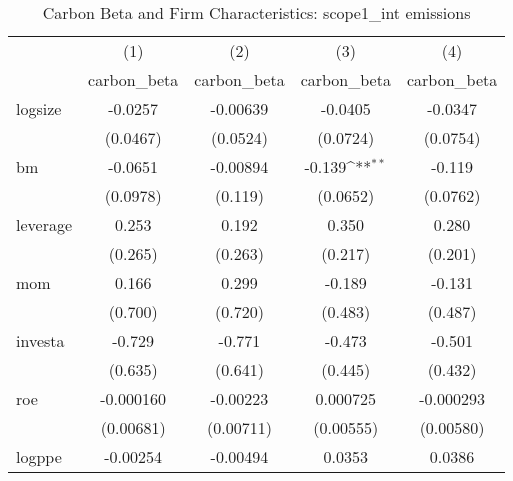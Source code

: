 \begin{table}[htbp]\centering
\def\sym#1{\ifmmode^{#1}\else\(^{#1}\)\fi}
\caption{Carbon Beta and Firm Characteristics: scope1\_int emissions}
\begin{tabular}{l*{4}{c}}
\hline\hline
                    &\multicolumn{1}{c}{(1)}&\multicolumn{1}{c}{(2)}&\multicolumn{1}{c}{(3)}&\multicolumn{1}{c}{(4)}\\
                    &\multicolumn{1}{c}{carbon\_beta}&\multicolumn{1}{c}{carbon\_beta}&\multicolumn{1}{c}{carbon\_beta}&\multicolumn{1}{c}{carbon\_beta}\\
\hline
logsize             &     -0.0257         &    -0.00639         &     -0.0405         &     -0.0347         \\
                    &    (0.0467)         &    (0.0524)         &    (0.0724)         &    (0.0754)         \\
[1em]
bm                  &     -0.0651         &    -0.00894         &      -0.139\sym{**} &      -0.119         \\
                    &    (0.0978)         &     (0.119)         &    (0.0652)         &    (0.0762)         \\
[1em]
leverage            &       0.253         &       0.192         &       0.350         &       0.280         \\
                    &     (0.265)         &     (0.263)         &     (0.217)         &     (0.201)         \\
[1em]
mom                 &       0.166         &       0.299         &      -0.189         &      -0.131         \\
                    &     (0.700)         &     (0.720)         &     (0.483)         &     (0.487)         \\
[1em]
investa             &      -0.729         &      -0.771         &      -0.473         &      -0.501         \\
                    &     (0.635)         &     (0.641)         &     (0.445)         &     (0.432)         \\
[1em]
roe                 &   -0.000160         &    -0.00223         &    0.000725         &   -0.000293         \\
                    &   (0.00681)         &   (0.00711)         &   (0.00555)         &   (0.00580)         \\
[1em]
logppe              &    -0.00254         &    -0.00494         &      0.0353         &      0.0386         \\

\end{tabular}
\end{table}
